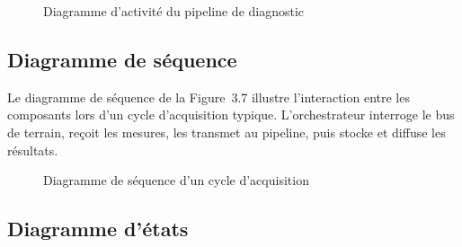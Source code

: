 \begin{figure}[H]
  \centering
  \caption{Diagramme d'activité du pipeline de diagnostic}
\end{figure}


\subsection{Diagramme de séquence}

Le diagramme de séquence de la Figure~3.7 illustre l'interaction entre les composants lors d'un cycle d'acquisition typique. L'orchestrateur interroge le bus de terrain, reçoit les mesures, les transmet au pipeline, puis stocke et diffuse les résultats.

\begin{figure}[H]
  \centering
  \caption{Diagramme de séquence d'un cycle d'acquisition}
\end{figure}


\subsection{Diagramme d'états}

